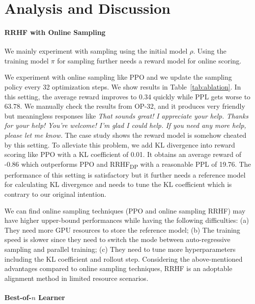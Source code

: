 \section{Analysis and Discussion}

\paragraph{RRHF with Online Sampling} We mainly experiment with sampling using the initial model $\rho$.
Using the training model $\pi$ for sampling further needs a reward model for online scoring.

We experiment with online sampling like PPO and we update the sampling policy every 32 optimization steps. We show results in Table~\ref{tab:ablation}. In this setting, the average reward improves to 0.34 quickly while PPL gets worse to 63.78. We manually check the results from OP-32, and it produces very friendly but meaningless responses like \textit{That sounds great! I appreciate your help. Thanks for your help! You’re welcome! I’m glad I could help. If you need any more help, please let me know.} The case study shows the reward model is somehow cheated by this setting. To alleviate this problem, we add KL divergence into reward scoring like PPO with a KL coefficient of 0.01. It obtains an average reward of -0.86 which outperforms PPO and RRHF\textsubscript{DP} with a reasonable PPL of 19.76. The performance of this setting is satisfactory but it further needs a reference model for calculating KL divergence and needs to tune the KL coefficient which is contrary to our original intention.

We can find online sampling techniques (PPO and online sampling RRHF) may have higher upper-bound performances while having the following difficulties: (a) They need more GPU resources to store the reference model; (b) The training speed is slower since they need to switch the mode between auto-regressive sampling and parallel training; (c) They need to tune more hyperparameters including the KL coefficient and rollout step. Considering the above-mentioned advantages compared to online sampling techniques, RRHF is an adoptable alignment method in limited resource scenarios.

\paragraph{Best-of-$n$ Learner}

